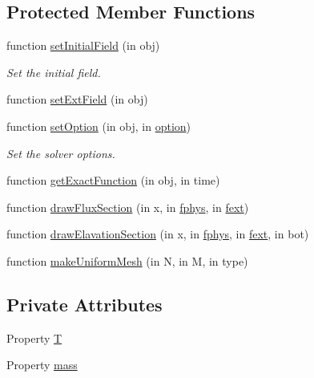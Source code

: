 \subsection*{Protected Member Functions}
\begin{DoxyCompactItemize}
\item 
function \hyperlink{class_parabolic_bowl2d_a5f7c55bae5b3bc99ba55a010e7d3a7ce}{set\+Initial\+Field} (in obj)
\begin{DoxyCompactList}\small\item\em Set the initial field. \end{DoxyCompactList}\item 
function \hyperlink{class_parabolic_bowl2d_a2a62539434589b02fc227a2e6d515164}{set\+Ext\+Field} (in obj)
\item 
function \hyperlink{class_parabolic_bowl2d_af349f96b6be1129260c14fe159335e69}{set\+Option} (in obj, in \hyperlink{class_ndg_phys_af91f4c54b93504e76b38a5693774dff1}{option})
\begin{DoxyCompactList}\small\item\em Set the solver options. \end{DoxyCompactList}\item 
function \hyperlink{class_parabolic_bowl2d_a31f667f7386b8d9c58d213d712adc43c}{get\+Exact\+Function} (in obj, in time)
\item 
function \hyperlink{class_parabolic_bowl2d_a52f15f1eebfc4d0cf9019691ffdfbb92}{draw\+Flux\+Section} (in x, in \hyperlink{class_ndg_phys_a6b25724fc9474d32018439009072f0a9}{fphys}, in \hyperlink{class_ndg_phys_mat_a2b0e8a77bf5f6fe870b12e400d6d83f3}{fext})
\item 
function \hyperlink{class_parabolic_bowl2d_a56f784a0fa47f2ef01ffce113e8778de}{draw\+Elavation\+Section} (in x, in \hyperlink{class_ndg_phys_a6b25724fc9474d32018439009072f0a9}{fphys}, in \hyperlink{class_ndg_phys_mat_a2b0e8a77bf5f6fe870b12e400d6d83f3}{fext}, in bot)
\item 
function \hyperlink{class_parabolic_bowl2d_a1c4369d164a64af5bd5728ebc00e0294}{make\+Uniform\+Mesh} (in N, in M, in type)
\end{DoxyCompactItemize}
\subsection*{Private Attributes}
\begin{DoxyCompactItemize}
\item 
Property \hyperlink{class_parabolic_bowl2d_affee9358e55b307788ad495ef9d1550b}{T}
\item 
Property \hyperlink{class_parabolic_bowl2d_a68a092c9145263a091d47ba3b504c51d}{mass}
\end{DoxyCompactItemize}
